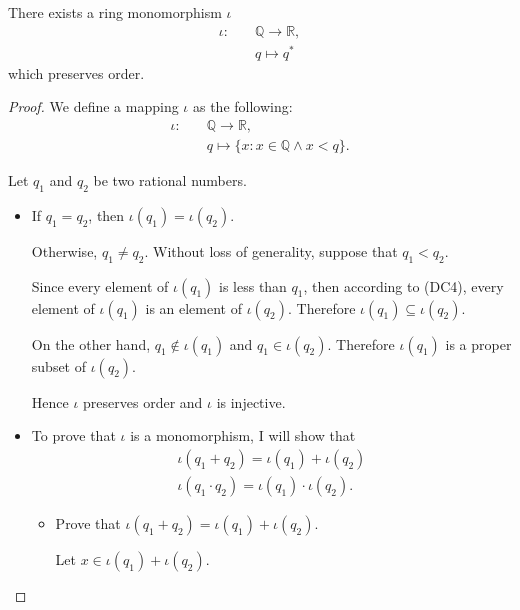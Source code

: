 \begin{theorem}
    There exists a ring monomorphism $\iota$
    \[
        \begin{split}
            \iota:\quad & \mathbb{Q}\to\mathbb{R}, \\
            & q\mapsto {q}^{*}
        \end{split}
    \]
    which preserves order.
\end{theorem}

\begin{proof}
    We define a mapping $\iota$ as the following:
    \[
        \begin{split}
            \iota:\quad & \mathbb{Q}\to\mathbb{R}, \\
            & q\mapsto \{ x : x\in\mathbb{Q}\land x < q \}.
        \end{split}
    \]

    Let $q_{1}$ and $q_{2}$ be two rational numbers.
    \begin{itemize}
        \item If $q_{1} = q_{2}$, then $\iota(q_{1}) = \iota(q_{2})$.

              Otherwise, $q_{1}\ne q_{2}$. Without loss of generality, suppose that $q_{1} < q_{2}$.

              Since every element of $\iota(q_{1})$ is less than $q_{1}$, then according to (DC4), every element of $\iota(q_{1})$ is an element of $\iota(q_{2})$. Therefore $\iota(q_{1})\subseteq\iota(q_{2})$.

              On the other hand, $q_{1}\notin\iota(q_{1})$ and $q_{1}\in\iota(q_{2})$. Therefore $\iota(q_{1})$ is a proper subset of $\iota(q_{2})$.

              Hence $\iota$ preserves order and $\iota$ is injective.
        \item To prove that $\iota$ is a monomorphism, I will show that
              \[
                  \begin{split}
                      \iota(q_{1} + q_{2}) = \iota(q_{1}) + \iota(q_{2}) \\
                      \iota(q_{1}\cdot q_{2}) = \iota(q_{1})\cdot\iota(q_{2}).
                  \end{split}
              \]
              \begin{itemize}
                  \item Prove that $\iota(q_{1} + q_{2}) = \iota(q_{1}) + \iota(q_{2})$.

                        Let $x\in\iota(q_{1}) + \iota(q_{2})$.


\end{itemize}
\end{itemize}
\end{proof}
